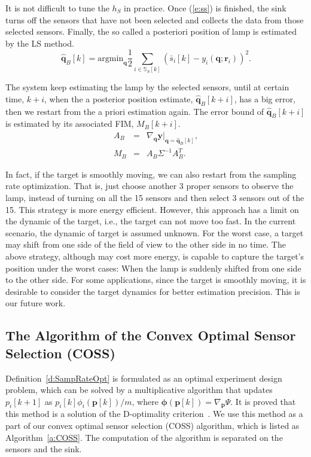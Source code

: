 It is not difficult to tune the $h_S$ in practice. Once (\ref{e:ss}) is finished, the sink turns off the sensors that have not been selected and collects the data from those selected sensors. Finally, the so called a posteriori position of lamp is estimated by the LS method.
\begin{equation*}\label{e:qB}
    \hat{\mathbf{q}}_B[k] = \mathrm{argmin}_{\mathbf{q}} \frac{1}{2} \sum_{i\in \mathbb{S}_S [k]} (\bar{s}_i[k]-y_i(\mathbf{q}; \mathbf{r}_i))^2.
\end{equation*}

The system keep estimating the lamp by the selected sensors, until at certain time, $k+i$, when the a posterior position estimate, $\hat{\mathbf{q}}_B[k+i]$, has a big error, then we restart from the a priori estimation again. The error bound of $\hat{\mathbf{q}}_B[k+i]$ is estimated by its associated FIM, $M_B[k+i]$.
\begin{eqnarray}
 A_B &=&  \nabla_{\mathbf{q}}\mathbf{y}|_{\mathbf{q}=\mathbf{\hat{q}}_B[k]}, \label{e:defAB} \nonumber \\
 M_B &=&  A_B \Sigma^{-1}A_B^T . \label{e:mb}
\end{eqnarray}


In fact, if the target is smoothly moving, we can also restart from the sampling rate optimization. That is, just choose another 3 proper sensors to observe the lamp, instead of turning on all the 15 sensors and then select 3 sensors out of the 15. This strategy is more energy efficient. However, this approach has a limit on the dynamic of the target, i.e., the target can not move too fast. In the current scenario, the dynamic of target is assumed unknown. For the worst case, a target may shift from one side of the field of view to the other side in no time. The above strategy, although may cost more energy, is capable to capture the target's position under the worst cases: When the lamp is suddenly shifted from one side to the other side.
    For some applications, since the target is smoothly moving, it is desirable to consider the target dynamics for better estimation precision. This is our future work.


\subsection{The Algorithm of the Convex Optimal Sensor Selection (COSS)}\label{s:solution}
    Definition~\ref{d:SampRateOpt} is formulated as an optimal experiment design problem, which can be solved by a multiplicative algorithm that updates $p_{i}[k+1]$ as $p_{i}[k]\phi_{i}(\mathbf{p}[k])/m$, where $\mathbf{\phi}(\mathbf{p}[k])=\nabla_{\mathbf{p}} \Psi.$ It is proved that this method is a solution of the D-optimality criterion~\cite{UcinskiOptDPS05,PazmanOED86}. We use this method as a part of our convex optimal sensor selection (COSS) algorithm, which is listed as Algorithm~\ref{a:COSS}. The computation of the algorithm is separated on the sensors and the sink.



